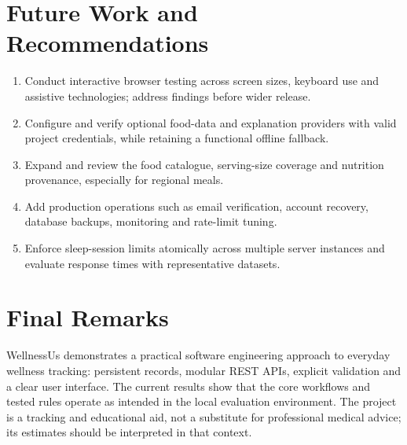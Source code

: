 \documentclass[10pt,a4paper,openany]{report}
\begin{document}
\section{Future Work and Recommendations}
\begin{enumerate}
\item Conduct interactive browser testing across screen sizes, keyboard use and assistive technologies; address findings before wider release.
\item Configure and verify optional food-data and explanation providers with valid project credentials, while retaining a functional offline fallback.
\item Expand and review the food catalogue, serving-size coverage and nutrition provenance, especially for regional meals.
\item Add production operations such as email verification, account recovery, database backups, monitoring and rate-limit tuning.
\item Enforce sleep-session limits atomically across multiple server instances and evaluate response times with representative datasets.
\end{enumerate}
\clearpage

\section{Final Remarks}
WellnessUs demonstrates a practical software engineering approach to everyday wellness tracking: persistent records, modular REST APIs, explicit validation and a clear user interface. The current results show that the core workflows and tested rules operate as intended in the local evaluation environment. The project is a tracking and educational aid, not a substitute for professional medical advice; its estimates should be interpreted in that context.
\end{document}

